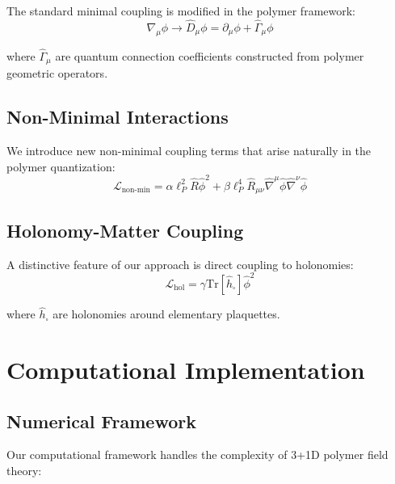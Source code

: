 \documentclass[11pt]{article}
\begin{document}
The standard minimal coupling is modified in the polymer framework:
\begin{equation}
\nabla_\mu \phi \to \hat{D}_\mu \phi = \partial_\mu \phi + \hat{\Gamma}_\mu \phi
\end{equation}

where $\hat{\Gamma}_\mu$ are quantum connection coefficients constructed from polymer geometric operators.

\subsection{Non-Minimal Interactions}

We introduce new non-minimal coupling terms that arise naturally in the polymer quantization:
\begin{equation}
\mathcal{L}_{\text{non-min}} = \alpha \ell_P^2 \hat{R} \hat{\phi}^2 + \beta \ell_P^4 \hat{R}_{\mu\nu} \hat{\nabla}^\mu \hat{\phi} \hat{\nabla}^\nu \hat{\phi}
\end{equation}

\subsection{Holonomy-Matter Coupling}

A distinctive feature of our approach is direct coupling to holonomies:
\begin{equation}
\mathcal{L}_{\text{hol}} = \gamma \text{Tr}[\hat{h}_{\square}] \hat{\phi}^2
\end{equation}

where $\hat{h}_{\square}$ are holonomies around elementary plaquettes.

\section{Computational Implementation}

\subsection{Numerical Framework}

Our computational framework handles the complexity of 3+1D polymer field theory:
\end{document}
